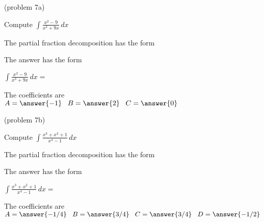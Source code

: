 \documentclass{ximera}
\begin{document}
\begin{problem}(problem 7a)

Compute $\displaystyle{\int \frac{x^2 - 9}{x^3 + 9x} \, dx}$

The partial fraction decomposition has the form

\begin{multipleChoice}
\end{multipleChoice}

The answer has the form

$\displaystyle{\int \frac{x^2 - 9}{x^3 + 9x} \, dx=}$

\begin{multipleChoice}
\end{multipleChoice}

The coefficients are\\
$A = \answer{-1} \;\;\; B = \answer{2} \;\;\; C = \answer{0}$

\end{problem}




\begin{problem}(problem 7b)

Compute $\displaystyle{\int \frac{x^3 + x^2 + 1}{x^4 - 1} \, dx}$

The partial fraction decomposition has the form

\begin{multipleChoice}
\end{multipleChoice}

The answer has the form

$\displaystyle{\int \frac{x^3 + x^2 + 1}{x^4 - 1} \, dx =}$

\begin{multipleChoice}
\end{multipleChoice}

The coefficients are\\
$A = \answer{-1/4} \;\;\; B = \answer{3/4} \;\;\; C = \answer{3/4} \;\;\; D = \answer{-1/2}$

\end{problem}
\end{document}
